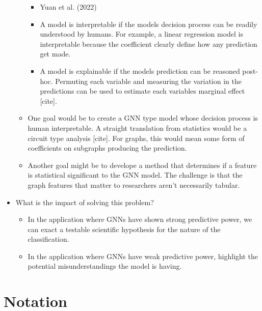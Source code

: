 \documentclass[
  11pt,
  letterpaper,
]{article}
\providecommand{\tightlist}{%
  \setlength{\itemsep}{0pt}\setlength{\parskip}{0pt}}\usepackage{longtable,booktabs,array}
\begin{document}
\begin{itemize}
\begin{itemize}
    \begin{itemize}
    \tightlist
    \item
      Yuan et al. (2022)
    \item
      A model is interpretable if the models decision process can be
      readily understood by humans. For example, a linear regression
      model is interpretable because the coefficient clearly define how
      any prediction get made.
    \item
      A model is explainable if the models prediction can be reasoned
      post-hoc. Permuting each variable and measuring the variation in
      the predictions can be used to estimate each variables marginal
      effect {[}cite{]}.
    \end{itemize}
  \item
    One goal would be to create a GNN type model whose decision process
    is human interpretable. A straight translation from statistics would
    be a circuit type analysis {[}cite{]}. For graphs, this would mean
    some form of coefficients on subgraphs producing the prediction.
  \item
    Another goal might be to develope a method that determines if a
    feature is statistical significant to the GNN model. The challenge
    is that the graph features that matter to researchers aren't
    necessarily tabular.
  \end{itemize}
\item
  What is the impact of solving this problem?

  \begin{itemize}
  \item
    In the application where GNNs have shown strong predictive power, we
    can exact a testable scientific hypothesis for the nature of the
    classification.
  \item
    In the application where GNNs have weak predictive power, highlight
    the potential misunderstandings the model is having.
  \end{itemize}
\end{itemize}

\hypertarget{notation}{%
\section{Notation}\label{notation}}
\end{document}
